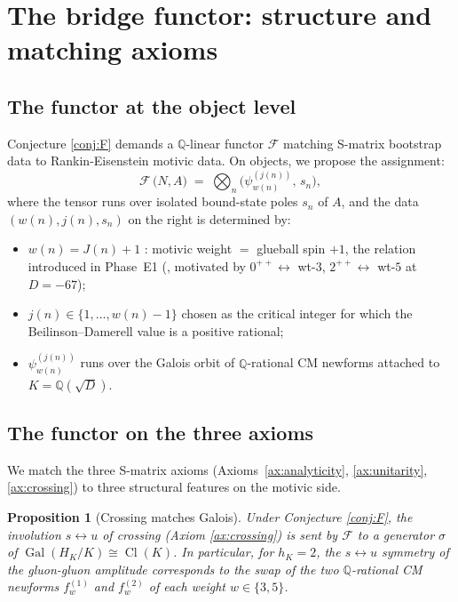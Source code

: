 \documentclass[11pt]{amsart}
\newtheorem{proposition}[theorem]{Proposition}
\theoremstyle{definition}
\theoremstyle{remark}
\DeclareMathOperator{\Cl}{Cl}
\DeclareMathOperator{\Gal}{Gal}
\newcommand{\Q}{\mathbb{Q}}
\newcommand{\HK}{H_K}
\begin{document}
\section{The bridge functor: structure and matching axioms}\label{sec:bridge-functor}

\subsection{The functor at the object level}\label{ss:F-objects}

Conjecture \ref{conj:F} demands a $\Q$-linear functor $\mathcal{F}$ matching
S-matrix bootstrap data to Rankin-Eisenstein motivic data.
On objects, we propose the assignment:
\[
\mathcal{F}\,\bigl(N, A\bigr) \;=\; \bigotimes_{n} \bigl(\psi_{w(n)}^{(j(n))},\, s_n\bigr),
\]
where the tensor runs over isolated bound-state poles $s_n$ of $A$,
and the data $(w(n), j(n), s_n)$ on the right is determined by:
\begin{itemize}
\item $w(n) = J(n) + 1$ : motivic weight $=$ glueball spin $+ 1$,
the relation introduced in Phase~E1 (\cite{PhaseE1}, motivated by
$0^{++} \leftrightarrow $ wt-$3$, $2^{++} \leftrightarrow$ wt-$5$ at
$D = -67$);
\item $j(n) \in \{1, \dots, w(n) - 1\}$ chosen as the critical integer for which
the Beilinson--Damerell value is a positive rational;
\item $\psi_{w(n)}^{(j(n))}$ runs over the Galois orbit of $\Q$-rational
CM newforms attached to $K = \Q(\sqrt{D})$.
\end{itemize}

\subsection{The functor on the three axioms}\label{ss:F-axioms}

We match the three S-matrix axioms (Axioms~\ref{ax:analyticity}, \ref{ax:unitarity},
\ref{ax:crossing}) to three structural features on the motivic side.

\begin{proposition}[Crossing matches Galois]\label{prop:F-crossing-Galois}
Under Conjecture \ref{conj:F}, the involution $s \leftrightarrow u$
of crossing (Axiom \ref{ax:crossing}) is sent by $\mathcal{F}$ to a generator
$\sigma$ of $\Gal(\HK/K) \cong \Cl(K)$. In particular, for $h_K = 2$, the
$s \leftrightarrow u$ symmetry of the gluon-gluon amplitude corresponds
to the swap of the two $\Q$-rational CM newforms $f_w^{(1)}$ and $f_w^{(2)}$
of each weight $w \in \{3, 5\}$.
\end{proposition}
\end{document}
